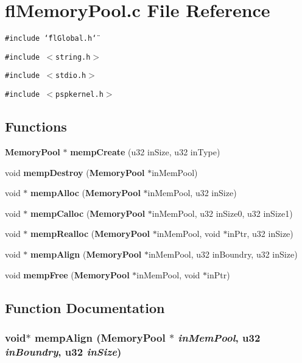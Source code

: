 \section{fl\-Memory\-Pool.c File Reference}
\label{flMemoryPool_8c}
{\tt \#include \char`\"{}fl\-Global.h\char`\"{}}\par
{\tt \#include $<$string.h$>$}\par
{\tt \#include $<$stdio.h$>$}\par
{\tt \#include $<$pspkernel.h$>$}\par
\subsection*{Functions}
\begin{CompactItemize}
\item 
{\bf Memory\-Pool} $\ast$ {\bf memp\-Create} (u32 in\-Size, u32 in\-Type)
\item 
void {\bf memp\-Destroy} ({\bf Memory\-Pool} $\ast$in\-Mem\-Pool)
\item 
void $\ast$ {\bf memp\-Alloc} ({\bf Memory\-Pool} $\ast$in\-Mem\-Pool, u32 in\-Size)
\item 
void $\ast$ {\bf memp\-Calloc} ({\bf Memory\-Pool} $\ast$in\-Mem\-Pool, u32 in\-Size0, u32 in\-Size1)
\item 
void $\ast$ {\bf memp\-Realloc} ({\bf Memory\-Pool} $\ast$in\-Mem\-Pool, void $\ast$in\-Ptr, u32 in\-Size)
\item 
void $\ast$ {\bf memp\-Align} ({\bf Memory\-Pool} $\ast$in\-Mem\-Pool, u32 in\-Boundry, u32 in\-Size)
\item 
void {\bf memp\-Free} ({\bf Memory\-Pool} $\ast$in\-Mem\-Pool, void $\ast$in\-Ptr)
\end{CompactItemize}


\subsection{Function Documentation}
\subsubsection{\setlength{\rightskip}{0pt plus 5cm}void$\ast$ memp\-Align ({\bf Memory\-Pool} $\ast$ {\em in\-Mem\-Pool}, u32 {\em in\-Boundry}, u32 {\em in\-Size})}\label{flMemoryPool_8c_8c5a1bdc836c08ee66a4551223b78a89}




